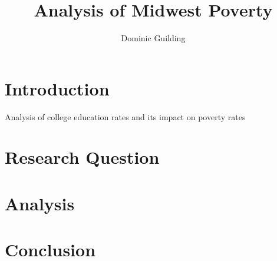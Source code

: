 \documentclass[12pt,a4paper]{article}
\author{Dominic Guilding}
\title{Analysis of Midwest Poverty}
\begin{document}
	\maketitle
	\section*{Introduction}
	Analysis of college education rates and its impact on poverty rates
	\section*{Research Question}
	
	\section*{Analysis}
	
	\section*{Conclusion}
	
\end{document}
